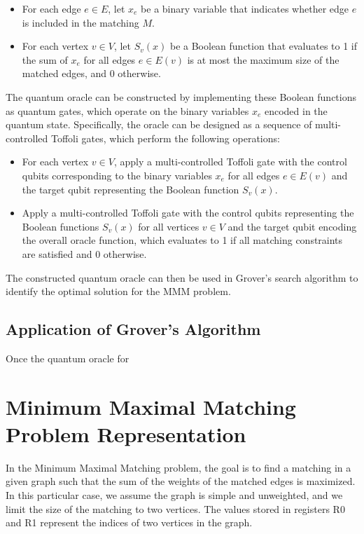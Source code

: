 \begin{itemize}
    \item For each edge $e \in E$, let $x_e$ be a binary variable that indicates whether edge $e$ is included in the matching $M$.
    \item For each vertex $v \in V$, let $S_v(x)$ be a Boolean function that evaluates to 1 if the sum of $x_e$ for all edges $e \in E(v)$ is at most the maximum size of the matched edges, and 0 otherwise.
\end{itemize}

The quantum oracle can be constructed by implementing these Boolean functions as quantum gates, which operate on the binary variables $x_e$ encoded in the quantum state. Specifically, the oracle can be designed as a sequence of multi-controlled Toffoli gates, which perform the following operations:

\begin{itemize}
    \item For each vertex $v \in V$, apply a multi-controlled Toffoli gate with the control qubits corresponding to the binary variables $x_e$ for all edges $e \in E(v)$ and the target qubit representing the Boolean function $S_v(x)$.
    \item Apply a multi-controlled Toffoli gate with the control qubits representing the Boolean functions $S_v(x)$ for all vertices $v \in V$ and the target qubit encoding the overall oracle function, which evaluates to 1 if all matching constraints are satisfied and 0 otherwise.
\end{itemize}

The constructed quantum oracle can then be used in Grover's search algorithm to identify the optimal solution for the MMM problem.

\subsection{Application of Grover's Algorithm}

Once the quantum oracle for

\section{Minimum Maximal Matching Problem Representation}

In the Minimum Maximal Matching problem, the goal is to find a matching in a given graph such that the sum of the weights of the matched edges is maximized. In this particular case, we assume the graph is simple and unweighted, and we limit the size of the matching to two vertices. The values stored in registers R0 and R1 represent the indices of two vertices in the graph.

